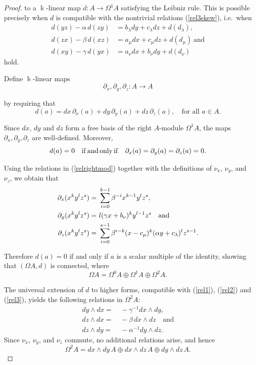 \documentclass{amsart}
\theoremstyle{definition}
\theoremstyle{remark}
\numberwithin{equation}{section}
\begin{document}
\begin{proof}
to a $\Bbbk$-linear map $d: A \to \Omega^{1} A$ satisfying the Leibniz rule. This is possible precisely when $d$ is compatible with the nontrivial relations {\rm (}\ref{rel3skew}{\rm )}, i.e.\ when
\begin{align*}
d(yz)-\alpha\, d(zy) & =b_{\lambda}dy+c_{\lambda}dz+d(d_{\lambda}), \\
d(zx)-\beta\, d(xz) & =a_{\mu}dx+c_{\mu}dz+d(d_{\mu}) \ \text{and} \\
d(xy)-\gamma\, d(yx) & = a_{\nu}dx+b_{\nu}dy+d(d_{\nu})
\end{align*}
hold.

Define $\Bbbk$-linear maps
\[
\partial_{x}, \partial_{y}, \partial_{z}: A \rightarrow A
\]

by requiring that
\[
d(a)=dx\,\partial_{x}(a)+dy\,\partial_{y}(a)+dz\,\partial_{z}(a), \quad \text{for all } a \in A.
\]

Since $dx$, $dy$ and $dz$ form a free basis of the right $A$-module $\Omega^1A$, the maps $\partial_x,\partial_y,\partial_z$ are well-defined. Moreover, 
$$
d(a)=0 \quad {\rm if\, and\, only\, if} \quad \partial_{x}(a) = \partial_{y}(a) = \partial_{z}(a)=0.
$$

Using the relations in {\rm (}\ref{relrightmod}{\rm )} together with the definitions of $\nu_{x}$, $\nu_{y}$, and $\nu_{z}$, we obtain that 
\begin{align}
\partial_{x}(x^ky^lz^s) = &\ \sum_{i=0}^{k-1}\beta^{-i}x^{k-1}y^lz^s, \notag \\
\partial_{y}(x^ky^lz^s) = &\ l(\gamma x+b_{\nu})^ky^{l-1}z^s \quad \text{and}  \\
\partial_{z}(x^ky^lz^s) = &\ \sum_{i=0}^{s-1}\beta^{i-k}(x-c_{\mu})^k(\alpha y+c_{\lambda})^lz^{s-1}. \notag
\end{align}

Therefore $d(a)=0$ if and only if $a$ is a scalar multiple of the identity, showing that $(\Omega A,d)$ is connected, where 
$$
\Omega A = \Omega^0 A \oplus \Omega^1 A \oplus \Omega^2 A.
$$

The universal extension of $d$ to higher forms, compatible with {\rm (}\ref{rel1}{\rm )}, {\rm (}\ref{rel2}{\rm )} and {\rm (}\ref{rel3}{\rm )}, yields the following relations in $\Omega^2A$:
\begin{align}
dy\wedge dx = &\ -\gamma^{-1}dx\wedge dy, \\
dz\wedge dx = &\ -\beta\, dx\wedge dz \quad \text{and} \\ 
dz\wedge dy = &\ -\alpha^{-1}dy\wedge dz. \label{relsecond}
\end{align}
Since $\nu_{x}$, $\nu_{y}$, and $\nu_{z}$ commute, no additional relations arise, and hence
\[
\Omega^2A =  dx\wedge dy\,A\oplus dx\wedge dz\,A\oplus dy\wedge dz\,A.
\]


\end{proof}
\end{document}
